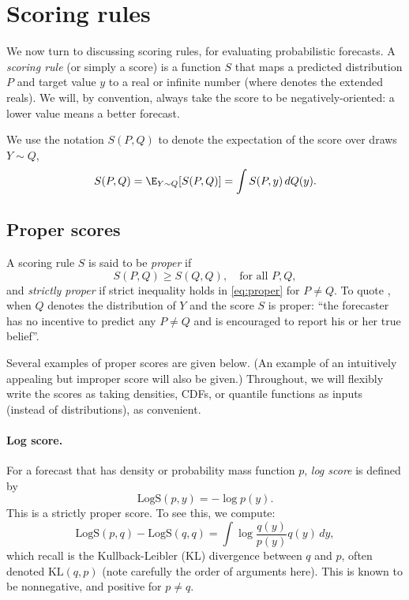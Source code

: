 \documentclass{article}
\begin{document}
\section{Scoring rules}

We now turn to discussing scoring rules, for evaluating probabilistic
forecasts. A \emph{scoring rule} (or simply a score) is a function $S$ that maps
a predicted distribution $P$ and target value $y$ to a real or infinite number 
 (where \smash{$\widebar\R = \R \cup \{\pm 
  \infty\}$} denotes the extended reals). We will, by convention, always take
the score to be negatively-oriented: a lower value means a better forecast.    

We use the notation $S(P, Q)$ to denote the expectation of the score over draws
$Y \sim Q$,  
\[
S(P, Q) = \E_{Y \sim Q} [S(P, Q)] = \int S(P, y) \, dQ(y).
\]

\subsection{Proper scores}

A scoring rule $S$ is said to be \emph{proper} if
\begin{equation}
\label{eq:proper}
S(P, Q) \geq S(Q, Q), \quad \text{for all $P,Q$},
\end{equation}
and \emph{strictly proper} if strict inequality holds in \eqref{eq:proper} for
$P \not= Q$. To quote \citet{gneiting2007strictly}, when $Q$ denotes the 
distribution of $Y$ and the score $S$ is proper: ``the forecaster has no
incentive to predict any $P \not= Q$ and is encouraged to report his or her true
belief''.  

Several examples of proper scores are given below. (An example of an intuitively
appealing but improper score will also be given.) Throughout, we will flexibly
write the scores as taking densities, CDFs, or quantile functions as inputs
(instead of distributions), as convenient.        

\paragraph{Log score.}

\def\KL{\mathrm{KL}}

For a forecast that has density or probability mass function $p$, \emph{log
  score} is defined by 
\begin{equation}
\label{eq:logs}
\mathrm{LogS}(p, y) = -\log p(y).
\end{equation}
This is a strictly proper score. To see this, we compute:
\begin{equation}
\label{eq:kl_div}
\mathrm{LogS}(p, q) - \mathrm{LogS}(q, q) = \int \log \frac{q(y)}{p(y)} q(y) \, 
dy,
\end{equation}
which recall is the Kullback-Leibler (KL) divergence between $q$ and $p$, often
denoted $\KL(q,p)$ (note carefully the order of arguments here). This is known
to be nonnegative, and positive for $p \not= q$.
\end{document}
